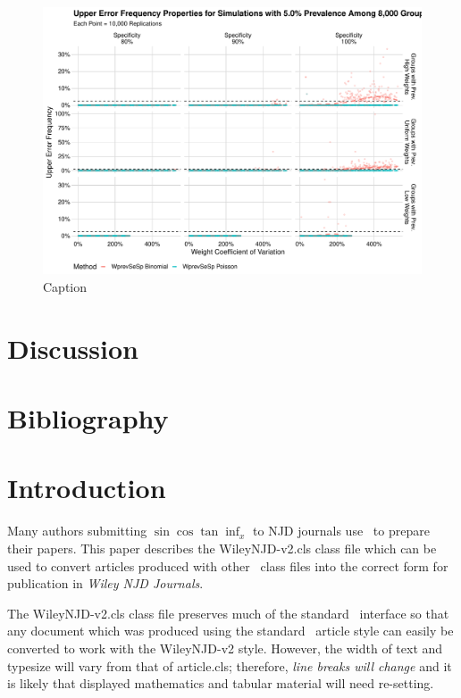 \documentclass[AMA,STIX1COL]{WileyNJD-v2}
\begin{document}
\begin{figure}
    \centering
    \includegraphics[width=\textwidth]{figures/imperfect_upper_error_frequency_8000_0_05_reduced.pdf}
    \caption{Caption}
    \label{fig:imperfect_upper_error_frequency_8000_0_05_reduced.pdf}
\end{figure}

\section{Discussion}

\section{Bibliography}
\nocite{*}%
%

\section{Introduction}\label{sec1}

Many authors submitting \( \sin \cos \tan \inf_{x} \) to NJD journals use \LaTeXe\ to
prepare their papers. This paper describes the
\textsf{WileyNJD-v2.cls} class file which can be used to convert
articles produced with other \LaTeXe\ class files into the correct
form for publication in \emph{Wiley NJD Journals}.

The \textsf{WileyNJD-v2.cls} class file preserves much of the standard
\LaTeXe\ interface so that any document which was produced using
the standard \LaTeXe\ \textsf{article} style can easily be
converted to work with the \textsf{WileyNJD-v2} style. However, the
width of text and typesize will vary from that of
\textsf{article.cls}; therefore, \emph{line breaks will change}
and it is likely that displayed mathematics and tabular material
will need re-setting.
\end{document}
